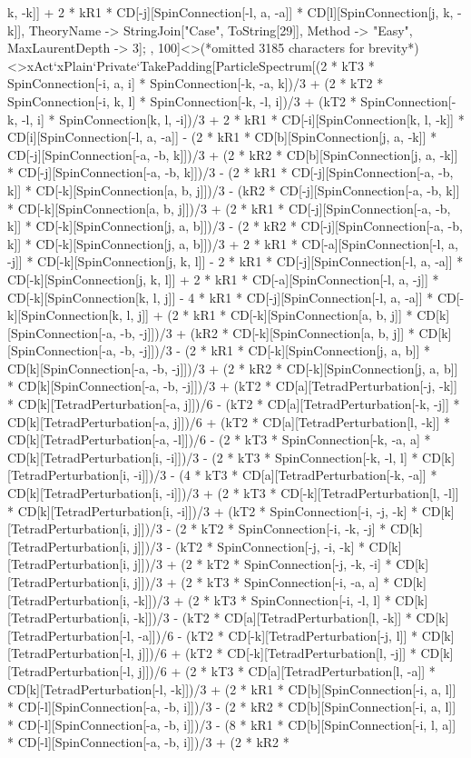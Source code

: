 k, -k]] + 2 * kR1 * CD[-j][SpinConnection[-l, a, -a]] * CD[l][SpinConnection[j, k, -k]], TheoryName -> StringJoin["Case", ToString[29]], Method -> "Easy", MaxLaurentDepth -> 3]; , 100]<>(*omitted 3185 characters for brevity*)<>xAct`xPlain`Private`TakePadding[ParticleSpectrum[(2 * kT3 * SpinConnection[-i, a, i] * SpinConnection[-k, -a, k])/3 + (2 * kT2 * SpinConnection[-i, k, l] * SpinConnection[-k, -l, i])/3 + (kT2 * SpinConnection[-k, -l, i] * SpinConnection[k, l, -i])/3 + 2 * kR1 * CD[-i][SpinConnection[k, l, -k]] * CD[i][SpinConnection[-l, a, -a]] - (2 * kR1 * CD[b][SpinConnection[j, a, -k]] * CD[-j][SpinConnection[-a, -b, k]])/3 + (2 * kR2 * CD[b][SpinConnection[j, a, -k]] * CD[-j][SpinConnection[-a, -b, k]])/3 - (2 * kR1 * CD[-j][SpinConnection[-a, -b, k]] * CD[-k][SpinConnection[a, b, j]])/3 - (kR2 * CD[-j][SpinConnection[-a, -b, k]] * CD[-k][SpinConnection[a, b, j]])/3 + (2 * kR1 * CD[-j][SpinConnection[-a, -b, k]] * CD[-k][SpinConnection[j, a, b]])/3 - (2 * kR2 * CD[-j][SpinConnection[-a, -b, k]] * CD[-k][SpinConnection[j, a, b]])/3 + 2 * kR1 * CD[-a][SpinConnection[-l, a, -j]] * CD[-k][SpinConnection[j, k, l]] - 2 * kR1 * CD[-j][SpinConnection[-l, a, -a]] * CD[-k][SpinConnection[j, k, l]] + 2 * kR1 * CD[-a][SpinConnection[-l, a, -j]] * CD[-k][SpinConnection[k, l, j]] - 4 * kR1 * CD[-j][SpinConnection[-l, a, -a]] * CD[-k][SpinConnection[k, l, j]] + (2 * kR1 * CD[-k][SpinConnection[a, b, j]] * CD[k][SpinConnection[-a, -b, -j]])/3 + (kR2 * CD[-k][SpinConnection[a, b, j]] * CD[k][SpinConnection[-a, -b, -j]])/3 - (2 * kR1 * CD[-k][SpinConnection[j, a, b]] * CD[k][SpinConnection[-a, -b, -j]])/3 + (2 * kR2 * CD[-k][SpinConnection[j, a, b]] * CD[k][SpinConnection[-a, -b, -j]])/3 + (kT2 * CD[a][TetradPerturbation[-j, -k]] * CD[k][TetradPerturbation[-a, j]])/6 - (kT2 * CD[a][TetradPerturbation[-k, -j]] * CD[k][TetradPerturbation[-a, j]])/6 + (kT2 * CD[a][TetradPerturbation[l, -k]] * CD[k][TetradPerturbation[-a, -l]])/6 - (2 * kT3 * SpinConnection[-k, -a, a] * CD[k][TetradPerturbation[i, -i]])/3 - (2 * kT3 * SpinConnection[-k, -l, l] * CD[k][TetradPerturbation[i, -i]])/3 - (4 * kT3 * CD[a][TetradPerturbation[-k, -a]] * CD[k][TetradPerturbation[i, -i]])/3 + (2 * kT3 * CD[-k][TetradPerturbation[l, -l]] * CD[k][TetradPerturbation[i, -i]])/3 + (kT2 * SpinConnection[-i, -j, -k] * CD[k][TetradPerturbation[i, j]])/3 - (2 * kT2 * SpinConnection[-i, -k, -j] * CD[k][TetradPerturbation[i, j]])/3 - (kT2 * SpinConnection[-j, -i, -k] * CD[k][TetradPerturbation[i, j]])/3 + (2 * kT2 * SpinConnection[-j, -k, -i] * CD[k][TetradPerturbation[i, j]])/3 + (2 * kT3 * SpinConnection[-i, -a, a] * CD[k][TetradPerturbation[i, -k]])/3 + (2 * kT3 * SpinConnection[-i, -l, l] * CD[k][TetradPerturbation[i, -k]])/3 - (kT2 * CD[a][TetradPerturbation[l, -k]] * CD[k][TetradPerturbation[-l, -a]])/6 - (kT2 * CD[-k][TetradPerturbation[-j, l]] * CD[k][TetradPerturbation[-l, j]])/6 + (kT2 * CD[-k][TetradPerturbation[l, -j]] * CD[k][TetradPerturbation[-l, j]])/6 + (2 * kT3 * CD[a][TetradPerturbation[l, -a]] * CD[k][TetradPerturbation[-l, -k]])/3 + (2 * kR1 * CD[b][SpinConnection[-i, a, l]] * CD[-l][SpinConnection[-a, -b, i]])/3 - (2 * kR2 * CD[b][SpinConnection[-i, a, l]] * CD[-l][SpinConnection[-a, -b, i]])/3 - (8 * kR1 * CD[b][SpinConnection[-i, l, a]] * CD[-l][SpinConnection[-a, -b, i]])/3 + (2 * kR2 * 